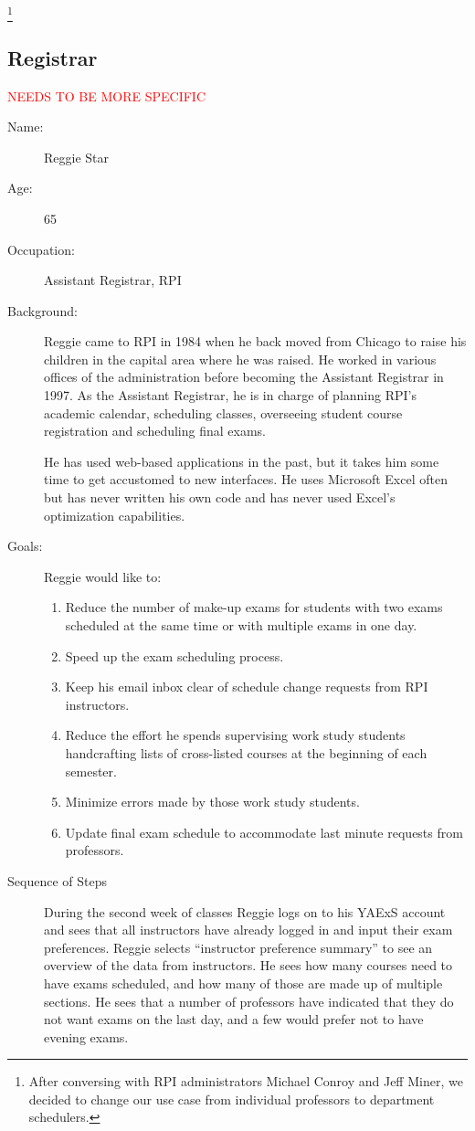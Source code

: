 \documentclass[11pt]{article}
\begin{document}
\footnote{After conversing with RPI administrators Michael Conroy and Jeff Miner, we
decided to change our use case from individual professors to department schedulers.}

\subsection{Registrar}
\textcolor{red}{NEEDS TO BE MORE SPECIFIC}
\begin{description}
\item[Name:] Reggie Star
\item[Age:]  65
\item[Occupation:] Assistant Registrar, RPI 
\item[Background:] Reggie came to RPI in 1984 when he  back moved from
 Chicago to raise his children in the capital area where he was raised.
He worked in various offices of the administration before becoming
 the Assistant Registrar in 1997.  As the Assistant Registrar, he is in charge of planning RPI's academic calendar, scheduling classes, overseeing student course registration and scheduling final exams.

He has used web-based applications in the past, but it takes him some
time to get accustomed to new interfaces.
He uses Microsoft Excel often but has never written his own code
 and has never used Excel’s optimization capabilities.

\item[Goals:]
Reggie would like to:
\begin{enumerate}
\item Reduce the number of make-up exams for students with two exams scheduled at the same time or with multiple exams in one day.
\item Speed up the exam scheduling process.
\item Keep his email inbox clear of schedule change requests from RPI instructors.
\item Reduce the effort he spends supervising work study students handcrafting lists of cross-listed courses at the beginning of each semester.
\item Minimize errors made by those work study students.
\item Update final exam schedule to accommodate last minute requests
from professors.
\end{enumerate}

\item[Sequence of Steps]
During the second week of classes Reggie logs on to his YAExS account and
 sees that all instructors have already logged in and input their
 exam preferences.
Reggie selects “instructor preference summary” to see an overview of
 the data from instructors. He sees how many courses need to have exams
 scheduled, and how many of those are made up of multiple sections.
He sees that a number of professors have indicated that they do not
want exams on the last day, and a few would prefer not to have evening exams.


\end{description}
\end{document}
